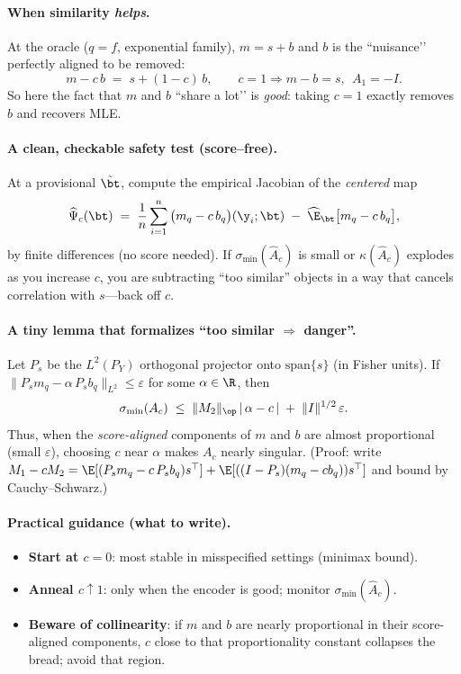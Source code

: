 \paragraph{When similarity \emph{helps}.}
At the oracle ($q=f$, exponential family), $m=s+b$ and $b$ is the “nuisance’’ perfectly aligned to be removed:
\[
m-c\,b\;=\;s+(1-c)\,b,\qquad c=1\Rightarrow m-b=s,\ \ A_1=-I.
\]
So here the fact that $m$ and $b$ “share a lot’’ is \emph{good}: taking $c=1$ exactly removes $b$ and recovers MLE.

\paragraph{A clean, checkable safety test (score–free).}
At a provisional $\tilde\bt$, compute the empirical Jacobian of the \emph{centered} map
\[
\widehat\Psi_c(\bt)\;=\;\frac1n\sum_{i=1}^n\big(m_q-c\,b_q\big)(\y_i;\bt)\;-\;\widehat{\E}_\bt\big[m_q-c\,b_q\big],
\]
by finite differences (no score needed). If $\sigma_{\min}(\widehat A_c)$ is small or $\kappa(\widehat A_c)$ explodes as you increase $c$, you are subtracting “too similar” objects in a way that cancels correlation with $s$—back off $c$.

\paragraph{A tiny lemma that formalizes “too similar $\Rightarrow$ danger”.}
Let $P_s$ be the $L^2(P_Y)$ orthogonal projector onto $\mathrm{span}\{s\}$ (in Fisher units).
If $\|P_s m_q - \alpha\,P_s b_q\|_{L^2}\le \varepsilon$ for some $\alpha\in\R$, then
\[
\sigma_{\min}(A_c)\;\le\;\|M_2\|_{\op}\,|\,\alpha-c\,|\;+\;\|I\|^{1/2}\,\varepsilon.
\]
Thus, when the \emph{score-aligned} components of $m$ and $b$ are almost proportional (small $\varepsilon$), choosing $c$ near $\alpha$ makes $A_c$ nearly singular. (Proof: write $M_1-cM_2=\E[(P_s m_q - c\,P_s b_q)s^\top]+\E[((I-P_s)(m_q-cb_q))s^\top]$ and bound by Cauchy–Schwarz.)

\paragraph{Practical guidance (what to write).}
\begin{itemize}
\item \textbf{Start at $c=0$}: most stable in misspecified settings (minimax bound).
\item \textbf{Anneal $c\uparrow 1$}: only when the encoder is good; monitor $\sigma_{\min}(\widehat A_c)$.
\item \textbf{ Beware of collinearity}: if $m$ and $b$ are nearly proportional in their score-aligned components, $c$ close to that proportionality constant collapses the bread; avoid that region.
\end{itemize}

